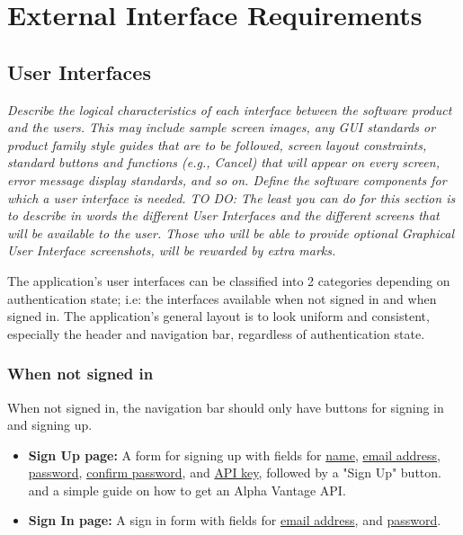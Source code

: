 \documentclass[12 pt, a4paper]{report}
\begin{document}
	\section {External Interface Requirements}
	\subsection {User Interfaces}
	\textit{Describe the logical characteristics of each interface between the software product and the users. This may include sample screen images, any GUI standards or product family style guides that are to be followed, screen layout constraints, standard buttons and functions (e.g., Cancel) that will appear on every screen, error message display standards, and so on. Define the software components for which a user interface is needed.
	TO DO: The least you can do for this section is to describe in words the different User Interfaces and the different screens that will be available to the user. Those who will be able to provide optional Graphical User Interface screenshots, will be rewarded by extra marks.}

	The application's user interfaces can be classified into 2 categories depending on authentication state; i.e: the interfaces available when not signed in and when signed in. The application's general layout is to look uniform and consistent, especially the header and navigation bar, regardless of authentication state.
	
	\subsubsection{When not signed in}
	When not signed in, the navigation bar should only have buttons for signing in and signing up.
	\begin{itemize}
		\item \textbf{Sign Up page:} A form for signing up with fields for \underline{name}, \underline{email address}, \underline{password}, \underline{confirm password}, and \underline{API key}, followed by a "Sign Up" button. and a simple guide on how to get an Alpha Vantage API.
		\item \textbf{Sign In page:} A sign in form with fields for \underline{email address}, and \underline{password}.
	\end{itemize}
\end{document}
